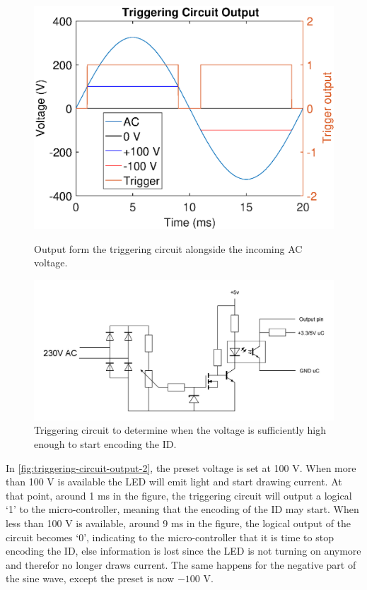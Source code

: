 	\begin{figure}[t]
		\centering
		\begin{minipage}[b]{0.49\textwidth}
			\includegraphics[width=\textwidth]{chapters/hardware-chapters/AC/ac-modulator/custom-hardware/ac-trigger/ac-wave-triggering.eps}
			\caption{Output form the triggering circuit alongside the incoming AC voltage.}
			\label{fig:triggering-circuit-output-2}
		\end{minipage}
		\hfill
		\begin{minipage}[b]{0.49\textwidth}
			\includegraphics[width=\textwidth]{chapters/hardware-chapters/AC/ac-modulator/custom-hardware/ac-trigger/custom-modulator-trigger.JPG}
		    \caption{Triggering circuit to determine when the voltage is sufficiently high enough to start encoding the ID.}
			\label{fig:custom-modulator-trigger}
		\end{minipage}
	\end{figure}

	In \autoref{fig:triggering-circuit-output-2}, the preset voltage is set at 100 V.
	When more than 100 V is available the LED will emit light and start drawing current.
	At that point, around 1 ms in the figure, the triggering circuit will output a logical `1' to the micro-controller, meaning that the encoding of the ID may start.
	When less than 100 V is available, around 9 ms in the figure, the logical output of the circuit becomes `0', indicating to the micro-controller that it is time to stop encoding the ID, else information is lost since the LED is not turning on anymore and therefor no longer draws current.
	The same happens for the negative part of the sine wave, except the preset is now $-100$ V.


